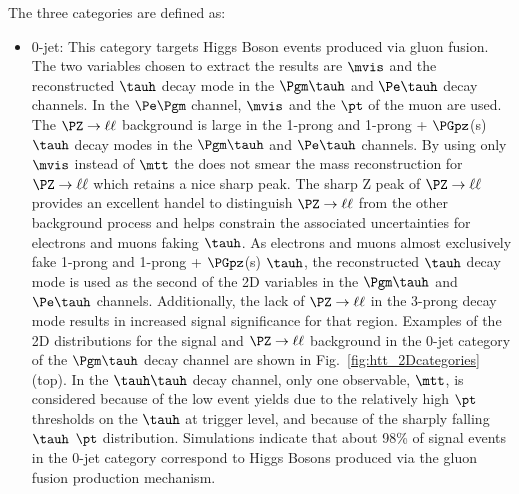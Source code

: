 The three categories are defined as:
\begin{itemize}
\item {0-jet}: This category targets Higgs Boson events produced via gluon fusion.
The two variables chosen to extract the results are $\mvis$ and
the reconstructed $\tauh$ decay mode in the $\Pgm\tauh$ and $\Pe\tauh$ decay channels.
In the $\Pe\Pgm$ channel, $\mvis$ and the $\pt$ of the muon are used. The $\PZ\to\ell\ell$ background 
is large in the 1-prong and 1-prong + $\PGpz$(s) $\tauh$ decay modes in the
$\Pgm\tauh$ and $\Pe\tauh$ channels. By using only $\mvis$ instead of $\mtt$ the \etvecmiss
does not smear the mass reconstruction for $\PZ\to\ell\ell$ which retains a nice sharp peak.
The sharp Z peak of $\PZ\to\ell\ell$ provides 
an excellent handel to distinguish $\PZ\to\ell\ell$ from the other background process and
helps constrain the associated uncertainties for electrons and muons faking $\tauh$.
As electrons and muons almost exclusively fake 1-prong and 1-prong + $\PGpz$(s) $\tauh$,
the reconstructed $\tauh$ decay mode is used as the second of the 2D variables in the
$\Pgm\tauh$ and $\Pe\tauh$ channels. Additionally, the lack of $\PZ\to\ell\ell$ in the
3-prong decay mode results in increased signal significance for that region.
Examples of the 2D distributions for the signal and $\PZ\to\ell\ell$ background
in the 0-jet category of the $\Pgm\tauh$ decay channel are shown in Fig.~\ref{fig:htt_2Dcategories} (top).
In the $\tauh\tauh$ decay channel, only one observable, $\mtt$, is considered because of the low
event yields due to the relatively high $\pt$ thresholds on the $\tauh$ at trigger level, and 
because of the sharply falling $\tauh$ $\pt$ distribution. Simulations indicate that about 98\% 
of signal events in the 0-jet category correspond to Higgs Bosons produced via the gluon 
fusion production mechanism.


\end{itemize}
